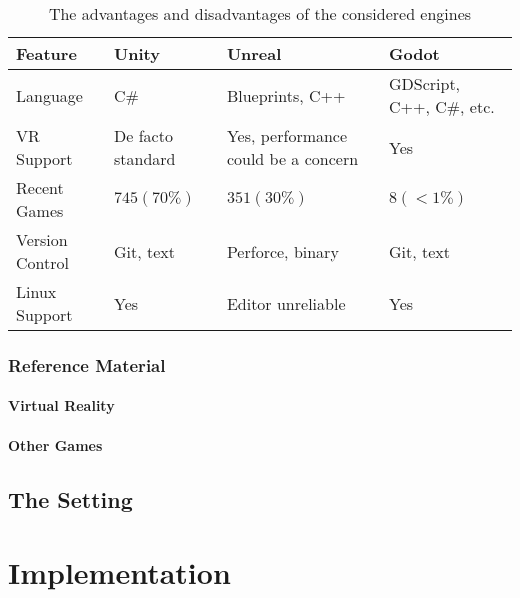 \documentclass[12pt, a4paper]{report}
\begin{document}
\begin{table}
  \caption{The advantages and disadvantages of the considered engines}
  \label{table:engine_compare}
  \begin{tabularx}{\textwidth}{lLLL}\toprule
    Feature & Unity & Unreal & Godot \\\midrule

    Language & C\# & Blueprints, C++ & GDScript, C++, C\#, etc. \\
    VR Support & De facto standard & Yes, performance could be a
    concern & Yes \\
    Recent Games & $745 (70\%)$ & $351 (30\%)$ & $8 (<1\%)$ \\
    Version Control & Git, text & Perforce, binary & Git, text \\
    Linux Support & Yes & Editor unreliable & Yes \\

    \bottomrule
  \end{tabularx}
\end{table}

\subsection{Reference Material}

\subsubsection{Virtual Reality}


\subsubsection{Other Games}

\section{The Setting}

\chapter{Implementation}
\end{document}
